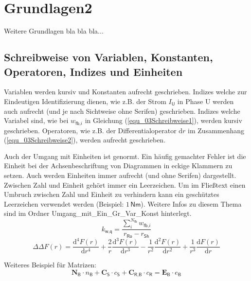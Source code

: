 \section{Grundlagen2}
\label{ch_03Grundlagen2}
Weitere Grundlagen bla bla bla...

\subsection{Schreibweise von Variablen, Konstanten, Operatoren, Indizes und Einheiten}
\label{ch_03Schreibweise}
Variablen werden kursiv und Konstanten aufrecht geschrieben. Indizes welche zur Eindeutigen Identifizierung dienen, wie z.B. der Strom $I_\textsf{U}$ in Phase U werden auch aufrecht (und je nach Sichtweise ohne Serifen) geschrieben. Indizes welche Variabel sind, wie bei $w_{\textsf{fb,}i}$ in Gleichung (\ref{equ_03Schreibweise1}), werden kursiv geschrieben. Operatoren, wie z.B. der Differentialoperator $\text{d} r$ im Zusammenhang (\ref{equ_03Schreibweise2}), werden aufrecht geschrieben.

Auch der Umgang mit Einheiten ist genormt. Ein häufig gemachter Fehler ist die Einheit bei der Achsenbeschriftung von Diagrammen in eckige Klammern zu setzen. Auch werden Einheiten immer aufrecht (und ohne Serifen) dargestellt. Zwischen Zahl und Einheit gehört immer ein Leerzeichen. Um im Fließtext einen Umbruch zwischen Zahl und Einheit zu verhindern kann ein geschütztes Leerzeichen verwendet werden (Beispiel: $1\,\textsf{Nm}$). Weitere Infos zu diesem Thema sind im Ordner Umgang\_mit\_Ein\_Gr\_Var\_Konst hinterlegt.
%
\begin{equation}
k_\textsf{w,q} = \frac{\sum\limits_{i}^{N_\textsf{fb}} w_{\textsf{fb,}i}}{r_\textsf{Ro} - r_\textsf{Sh}}
\label{equ_03Schreibweise1}
\end{equation}
%
%
\begin{equation}
\Delta \Delta F(r) = \frac{\text{d}^4 F(r)}{\text{d} r^4}  + \frac{2}{r} \frac{\text{d}^3 F(r)}{\text{d} r^3} - \frac{1}{r^2} \frac{\text{d}^2 F(r)}{\text{d} r^2} + \frac{1}{r^3} \frac{\text{d} F(r)}{\text{d} r}
\label{equ_03Schreibweise2}
\end{equation}
%

Weiteres Beispiel für Matrizen:
%
\begin{equation}
\textbf{N}_\textsf{B} \cdot n_\textsf{B} + \textbf{C}_\textsf{S} \cdot c_\textsf{S} + \textbf{C}_\textsf{R,B} \cdot c_\textsf{R} = \textbf{E}_\textsf{B} \cdot e_\textsf{B}
\label{equ_04ModellLuft24}
\end{equation}
%

